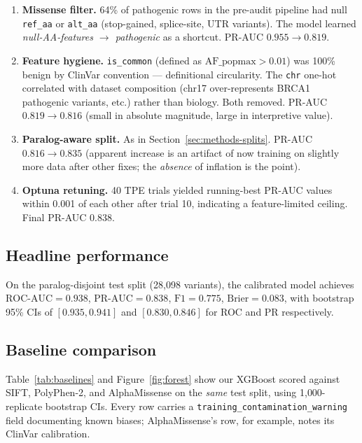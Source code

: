 \documentclass[11pt,a4paper]{article}
\begin{document}
\begin{enumerate}
    \item \textbf{Missense filter.} 64\% of pathogenic rows in the
          pre-audit pipeline had null \texttt{ref\_aa} or
          \texttt{alt\_aa} (stop-gained, splice-site, UTR
          variants). The model learned
          \emph{null-AA-features \(\to\) pathogenic} as a
          shortcut. PR-AUC \(0.955 \to 0.819\).
    \item \textbf{Feature hygiene.} \texttt{is\_common} (defined
          as \(\text{AF\_popmax} > 0.01\)) was 100\% benign by
          ClinVar convention --- definitional circularity. The
          \texttt{chr} one-hot correlated with dataset
          composition (chr17 over-represents BRCA1 pathogenic
          variants, etc.) rather than biology. Both removed.
          PR-AUC \(0.819 \to 0.816\) (small in absolute
          magnitude, large in interpretive value).
    \item \textbf{Paralog-aware split.} As in
          Section~\ref{sec:methods-splits}. PR-AUC
          \(0.816 \to 0.835\) (apparent increase is an artifact
          of now training on slightly more data after other
          fixes; the \emph{absence} of inflation is the point).
    \item \textbf{Optuna retuning.} 40 TPE trials yielded
          running-best PR-AUC values within 0.001 of each other
          after trial 10, indicating a feature-limited ceiling.
          Final PR-AUC \(0.838\).
\end{enumerate}

\subsection{Headline performance}
\label{sec:results-headline}

On the paralog-disjoint test split (28{,}098 variants), the
calibrated model achieves
\(\text{ROC-AUC} = 0.938\), \(\text{PR-AUC} = 0.838\),
\(\text{F1} = 0.775\), \(\text{Brier} = 0.083\), with
bootstrap 95\% CIs of \([0.935, 0.941]\) and
\([0.830, 0.846]\) for ROC and PR respectively.

\subsection{Baseline comparison}
\label{sec:results-baselines}

Table~\ref{tab:baselines} and Figure~\ref{fig:forest} show our
XGBoost scored against SIFT, PolyPhen-2, and AlphaMissense on
the \emph{same} test split, using 1{,}000-replicate bootstrap
CIs. Every row carries a
\texttt{training\_contamination\_warning} field documenting
known biases; AlphaMissense's row, for example, notes its
ClinVar calibration.
\end{document}
